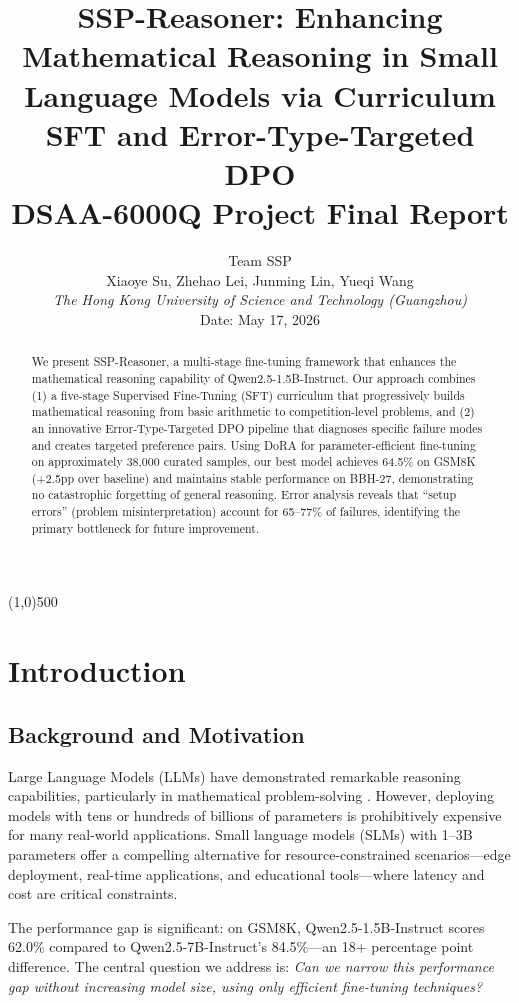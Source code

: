 \documentclass{article}
\title{\textbf{SSP-Reasoner: Enhancing Mathematical Reasoning in Small Language Models via Curriculum SFT and Error-Type-Targeted DPO}\\[0.5em]
\large DSAA-6000Q Project Final Report}
\author{
Team SSP \\
Xiaoye Su, Zhehao Lei, Junming Lin, Yueqi Wang \\[0.5em]
\textit{The Hong Kong University of Science and Technology (Guangzhou)} \\
Date: May 17, 2026
}
\date{}
\begin{document}
\maketitle

\begin{abstract}
We present SSP-Reasoner, a multi-stage fine-tuning framework that enhances the mathematical reasoning capability of Qwen2.5-1.5B-Instruct. Our approach combines (1) a five-stage Supervised Fine-Tuning (SFT) curriculum that progressively builds mathematical reasoning from basic arithmetic to competition-level problems, and (2) an innovative Error-Type-Targeted DPO pipeline that diagnoses specific failure modes and creates targeted preference pairs. Using DoRA for parameter-efficient fine-tuning on approximately 38,000 curated samples, our best model achieves 64.5\% on GSM8K (+2.5pp over baseline) and maintains stable performance on BBH-27, demonstrating no catastrophic forgetting of general reasoning. Error analysis reveals that ``setup errors'' (problem misinterpretation) account for 65--77\% of failures, identifying the primary bottleneck for future improvement.
\end{abstract}

\line(1,0){500}

\section{Introduction}

\subsection{Background and Motivation}
Large Language Models (LLMs) have demonstrated remarkable reasoning capabilities, particularly in mathematical problem-solving \citep{qwen2025qwen25}. However, deploying models with tens or hundreds of billions of parameters is prohibitively expensive for many real-world applications. Small language models (SLMs) with 1--3B parameters offer a compelling alternative for resource-constrained scenarios---edge deployment, real-time applications, and educational tools---where latency and cost are critical constraints.

The performance gap is significant: on GSM8K, Qwen2.5-1.5B-Instruct scores 62.0\% compared to Qwen2.5-7B-Instruct's 84.5\%---an 18+ percentage point difference. The central question we address is: \textit{Can we narrow this performance gap without increasing model size, using only efficient fine-tuning techniques?}
\end{document}

